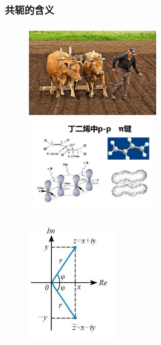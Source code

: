 {\frame
{
	\frametitle{共轭的含义}
\begin{minipage}{0.63\textwidth}
\begin{figure}[h!]
\vskip -23pt
\centering
\includegraphics[height=1.6in,width=2.2in,viewport=0 0 600 490,clip]{Figures/Bi-Yoke_1.jpg}
\vskip 2pt
\includegraphics[height=1.5in,width=2.2in,viewport=0 0 750 530,clip]{Figures/Conjugate_Pi-bond.png}
\label{Conjugate_1}
\end{figure}
\end{minipage}
\begin{minipage}{0.35\textwidth}
\begin{figure}[h!]
\centering
\includegraphics[height=2.2in,width=1.5in,viewport=0 0 250 390,clip]{Figures/Conjugate_complex.jpg}
\label{Conjugate_2}
\end{figure}
\end{minipage}
}

}

